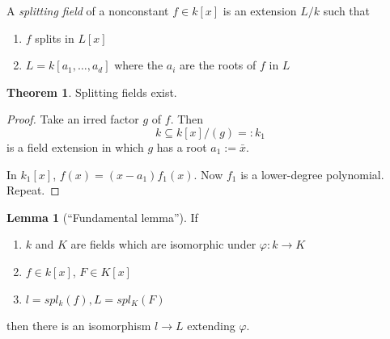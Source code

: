\documentclass{article}
\theoremstyle{definition}
\newtheorem*{lem}{Lemma}
\newtheorem*{thm}{Theorem}
\begin{document}
A \textit{splitting field}  of a nonconstant $f\in k[x]$ is an extension $L/k$
such that
\begin{enumerate}
\item $f$ splits in $L[x]$
\item $L = k[a_1,\ldots,a_d]$
  where the $a_i$ are the roots of $f$ in $L$
\end{enumerate}

\begin{thm}
 Splitting fields exist. 
\end{thm}
\begin{proof}
  Take an irred factor $g$ of $f$. Then
  $$k \subseteq k[x]/(g) =: k_1$$
  is a field extension in which $g$ has a root $a_1 := \bar x$.

  In $k_1[x]$, $f(x) = (x-a_1)f_1(x)$. Now $f_1$ is a lower-degree polynomial. Repeat.
\end{proof}

\begin{lem}[``Fundamental lemma'']
  If
  \begin{enumerate}
  \item $k$ and $K$ are fields which are isomorphic under $\varphi:k\to K$
  \item $f\in k[x]$, $F\in K[x]$
  \item $l = spl_k(f), L = spl_K(F)$
  \end{enumerate}
  then there is an isomorphism $l\to L$ extending $\varphi$.
\end{lem}
\end{document}
